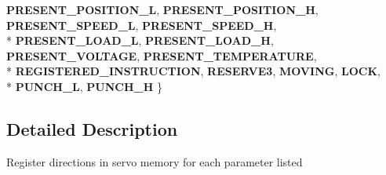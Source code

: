 \begin{DoxyCompactItemize}
{\bfseries P\+R\+E\+S\+E\+N\+T\+\_\+\+P\+O\+S\+I\+T\+I\+O\+N\+\_\+L}, 
{\bfseries P\+R\+E\+S\+E\+N\+T\+\_\+\+P\+O\+S\+I\+T\+I\+O\+N\+\_\+H}, 
{\bfseries P\+R\+E\+S\+E\+N\+T\+\_\+\+S\+P\+E\+E\+D\+\_\+L}, 
{\bfseries P\+R\+E\+S\+E\+N\+T\+\_\+\+S\+P\+E\+E\+D\+\_\+H}, 
\\*
{\bfseries P\+R\+E\+S\+E\+N\+T\+\_\+\+L\+O\+A\+D\+\_\+L}, 
{\bfseries P\+R\+E\+S\+E\+N\+T\+\_\+\+L\+O\+A\+D\+\_\+H}, 
{\bfseries P\+R\+E\+S\+E\+N\+T\+\_\+\+V\+O\+L\+T\+A\+GE}, 
{\bfseries P\+R\+E\+S\+E\+N\+T\+\_\+\+T\+E\+M\+P\+E\+R\+A\+T\+U\+RE}, 
\\*
{\bfseries R\+E\+G\+I\+S\+T\+E\+R\+E\+D\+\_\+\+I\+N\+S\+T\+R\+U\+C\+T\+I\+ON}, 
{\bfseries R\+E\+S\+E\+R\+V\+E3}, 
{\bfseries M\+O\+V\+I\+NG}, 
{\bfseries L\+O\+CK}, 
\\*
{\bfseries P\+U\+N\+C\+H\+\_\+L}, 
{\bfseries P\+U\+N\+C\+H\+\_\+H}
 \}\hypertarget{group__SREGISTER__GROUP_gab5eb3a95234952d2927e68fd48a19145}{}\label{group__SREGISTER__GROUP_gab5eb3a95234952d2927e68fd48a19145}

\end{DoxyCompactItemize}


\subsection{Detailed Description}
Register directions in servo memory for each parameter listed 